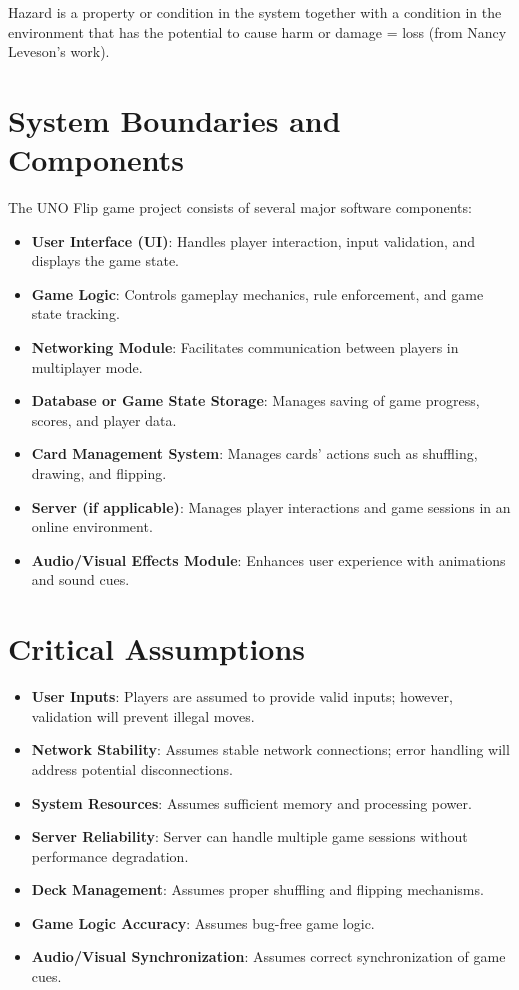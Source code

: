 \documentclass{article}
\begin{document}
Hazard is a property or condition in the system together with a condition in the environment that has the potential to cause harm or damage = loss (from Nancy Leveson's work).

\section{System Boundaries and Components}
The UNO Flip game project consists of several major software components:
\begin{itemize}
    \item \textbf{User Interface (UI)}: Handles player interaction, input validation, and displays the game state.
    \item \textbf{Game Logic}: Controls gameplay mechanics, rule enforcement, and game state tracking.
    \item \textbf{Networking Module}: Facilitates communication between players in multiplayer mode.
    \item \textbf{Database or Game State Storage}: Manages saving of game progress, scores, and player data.
    \item \textbf{Card Management System}: Manages cards' actions such as shuffling, drawing, and flipping.
    \item \textbf{Server (if applicable)}: Manages player interactions and game sessions in an online environment.
    \item \textbf{Audio/Visual Effects Module}: Enhances user experience with animations and sound cues.
\end{itemize}

\section{Critical Assumptions}
\begin{itemize}
    \item \textbf{User Inputs}: Players are assumed to provide valid inputs; however, validation will prevent illegal moves.
    \item \textbf{Network Stability}: Assumes stable network connections; error handling will address potential disconnections.
    \item \textbf{System Resources}: Assumes sufficient memory and processing power.
    \item \textbf{Server Reliability}: Server can handle multiple game sessions without performance degradation.
    \item \textbf{Deck Management}: Assumes proper shuffling and flipping mechanisms.
    \item \textbf{Game Logic Accuracy}: Assumes bug-free game logic.
    \item \textbf{Audio/Visual Synchronization}: Assumes correct synchronization of game cues.
\end{itemize}
\end{document}
